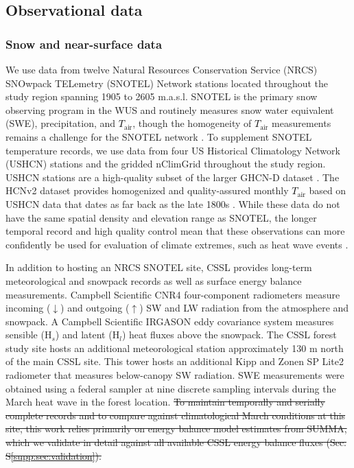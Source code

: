 \documentclass[draft]{agujournal2019}
\newcommand{\fig}[2]{\textcolor{red}{(Fig.~\ref{#1}{#2})}}   %
\newcommand{\tair}{\textcolor{black}{$T_{\mathrm{air}}$}\xspace}
\providecommand{\DIFadd}[1]{{\protect\color{blue}\uwave{#1}}} %
\providecommand{\DIFdel}[1]{{\protect\color{red}\sout{#1}}}                      %
\providecommand{\DIFaddbegin}{} %
\providecommand{\DIFaddend}{} %
\providecommand{\DIFdelbegin}{} %
\providecommand{\DIFdelend}{} %
\begin{document}
\subsection{Observational data}\label{sec:observational_data}
\subsubsection{Snow and near-surface data}
We use data from twelve Natural Resources Conservation Service (NRCS) SNOwpack TELemetry (SNOTEL) Network stations located throughout the study region \DIFaddbegin \DIFadd{\fig{fig:region_map}{b} }\DIFaddend spanning 1905 to 2605 m.a.s.l.
SNOTEL is the primary snow observing program in the WUS \cite{Serreze1999-as} and routinely measures snow water equivalent (SWE), precipitation, and \tair, though the homogeneity of \tair measurements remains a challenge for the SNOTEL network \cite{Oyler2015-by, McAfee2019-mt}.
To supplement SNOTEL temperature records, we use data from four US Historical Climatology Network (USHCN) stations and the gridded nClimGrid \cite{Durre2022-be} throughout the study region.
USHCN stations are a high-quality subset of the larger GHCN-D dataset \cite{Menne2012-uu}.
The HCNv2 dataset provides homogenized and quality-assured monthly \tair based on USHCN data that dates as far back as the late 1800s \cite{Menne2009-ushcn}.
While these data do not have the same spatial density and elevation range as SNOTEL, the longer temporal record and high quality control mean that these observations can more confidently be used for evaluation of climate extremes, such as heat wave events \cite{BercosHickey2022}.

In addition to hosting an NRCS SNOTEL site, CSSL provides long-term meteorological and snowpack records as well as surface energy balance measurements.
Campbell Scientific CNR4 four-component radiometers measure incoming ($\downarrow$) and outgoing ($\uparrow$) SW and LW radiation from the atmosphere and snowpack.
A Campbell Scientific IRGASON eddy covariance system measures sensible (H$_s$) and latent (H$_l$) heat fluxes above the snowpack.
The CSSL forest study site hosts an additional meteorological station approximately 130 m north of the main CSSL site.
This tower hosts an additional Kipp and Zonen SP Lite2 radiometer that measures below-canopy SW radiation.
SWE measurements were obtained using a federal sampler \cite{Osterhuber2014-ic} at nine discrete sampling intervals during the March heat wave in the forest location.
\DIFdelbegin \DIFdel{To maintain temporally and serially complete records and to compare against climatological March conditions at this site, this work relies primarily on energy balance model estimates from SUMMA, which we validate in detail against all available CSSL energy balance fluxes (Sec. S\ref{supp:sec:validation}).
}\DIFdelend 
\end{document}
